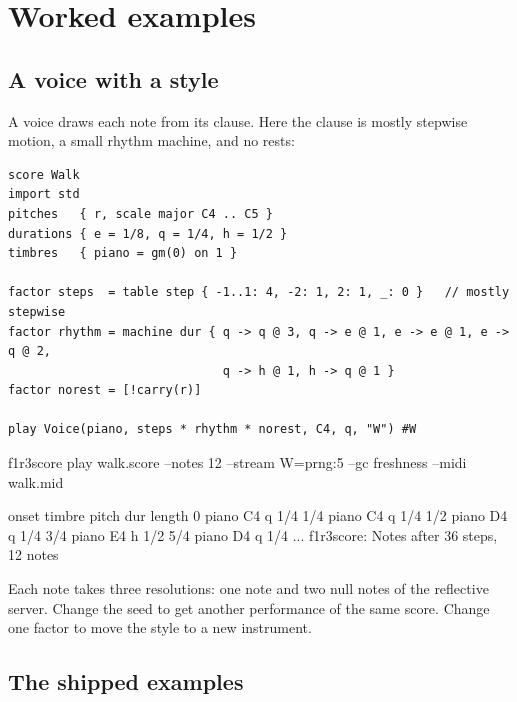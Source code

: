 \documentclass[11pt,a4paper]{article}
\begin{document}
\section{Worked examples}\label{sec:examples}

\subsection{A voice with a style}

A voice draws each note from its clause. Here the clause is mostly stepwise
motion, a small rhythm machine, and no rests:
\begin{lstlisting}[language=score]
score Walk
import std
pitches   { r, scale major C4 .. C5 }
durations { e = 1/8, q = 1/4, h = 1/2 }
timbres   { piano = gm(0) on 1 }

factor steps  = table step { -1..1: 4, -2: 1, 2: 1, _: 0 }   // mostly stepwise
factor rhythm = machine dur { q -> q @ 3, q -> e @ 1, e -> e @ 1, e -> q @ 2,
                              q -> h @ 1, h -> q @ 1 }
factor norest = [!carry(r)]

play Voice(piano, steps * rhythm * norest, C4, q, "W") #W
\end{lstlisting}
\begin{shell}
f1r3score play walk.score --notes 12 --stream W=prng:5 --gc freshness --midi walk.mid
\end{shell}
\begin{out}
     onset  timbre     pitch  dur     length
         0  piano      C4     q          1/4
       1/4  piano      C4     q          1/4
       1/2  piano      D4     q          1/4
       3/4  piano      E4     h          1/2
       5/4  piano      D4     q          1/4
       ...
f1r3score: Notes after 36 steps, 12 notes
\end{out}
\noindent Each note takes three resolutions: one note and two null notes of
the reflective server. Change the seed to get another performance of the same
score. Change one factor to move the style to a new instrument.

\subsection{The shipped examples}
\end{document}
